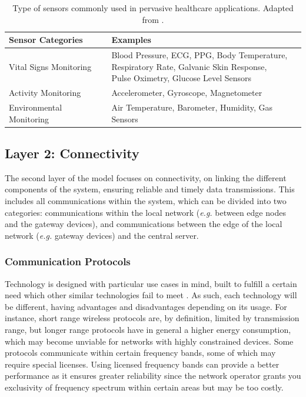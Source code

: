 \renewcommand{\arraystretch}{2}
\begin{table}[H]
    \centering
    \caption[Type of sensors commonly used in pervasive healthcare applications.]{Type of sensors commonly used in pervasive healthcare applications. Adapted from \cite{MinhDang2019}.}
    \begin{tabular}{l|l}
        \textbf{Sensor Categories} & \textbf{Examples} \\ 
        \hline
        Vital Signs Monitoring & \makecell{Blood Pressure, \acs{ECG}, PPG, Body Temperature, \\ Respiratory Rate, Galvanic Skin Response, \\ Pulse Oximetry, Glucose Level Sensors} \\
        Activity Monitoring & Accelerometer, Gyroscope, Magnetometer\\
        Environmental Monitoring & Air Temperature, Barometer, Humidity, Gas Sensors \\
    \end{tabular}
    \label{tab:layer1-sensors} 
\end{table}
\renewcommand{\arraystretch}{1}

\subsection{Layer 2: Connectivity}
\label{sec:iot-model-layer2}

The second layer of the model focuses on connectivity, on linking the different components of the system, ensuring reliable and timely data transmissions. This includes all communications within the system, which can be divided into two categories: communications within the local network (\textit{e.g.} between edge nodes and the gateway devices), and communications between the edge of the local network (\textit{e.g.} gateway devices) and the central server. \bigskip

\subsubsection{Communication Protocols}

Technology is designed with particular use cases in mind, built to fulfill a certain need which other similar technologies fail to meet \cite{Cisco2014}. As such, each technology will be different, having advantages and disadvantages depending on its usage. For instance, short range wireless protocols are, by definition, limited by transmission range, but longer range protocols have in general a higher energy consumption, which may become unviable for networks with highly constrained devices. Some protocols communicate within certain frequency bands, some of which may require special licenses. Using licensed frequency bands can provide a better performance as it ensures greater reliability since the network operator grants you exclusivity of frequency spectrum within certain areas but may be too costly. \bigskip

